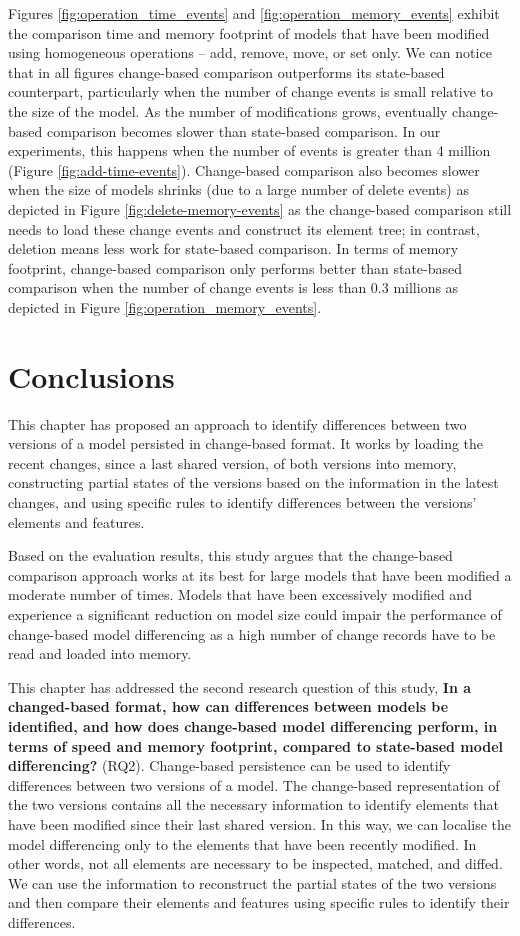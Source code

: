 Figures \ref{fig:operation_time_events} and \ref{fig:operation_memory_events} exhibit the comparison time and memory footprint of models that have been modified using homogeneous operations -- \textsf{add}, \textsf{remove}, \textsf{move}, or \textsf{set} only. We can notice that in all figures change-based comparison outperforms its state-based counterpart, particularly when the number of change events is small relative to the size of the model. As the number of modifications grows, eventually change-based comparison becomes slower than state-based comparison. In our experiments, this happens when the number of events is greater than 4 million (Figure \ref{fig:add-time-events}). Change-based comparison also becomes slower when the size of models shrinks (due to a large number of delete events) as depicted in Figure \ref{fig:delete-memory-events} as the change-based comparison still needs to load these change events and construct its element tree; in contrast, deletion means less work for state-based comparison. In terms of memory footprint, change-based comparison only performs better than state-based comparison when the number of change events is less than 0.3 millions as depicted in Figure \ref{fig:operation_memory_events}.

\section{Conclusions}
\label{sec:conclusions_6}
This chapter has proposed an approach to identify differences between two versions of a model persisted in change-based format. It works by loading the recent changes, since a last shared version, of both versions into memory, constructing partial states of the versions based on the information in the latest changes, and using specific rules to identify differences between the versions' elements and features.   

Based on the evaluation results, this study argues that the change-based comparison approach works at its best for large models that have been modified a moderate number of times. Models that have been excessively modified and experience a significant reduction on model size could impair the performance of change-based model differencing as a high number of change records have to be read and loaded into memory.

This chapter has addressed the second research question of this study, \textbf{In a changed-based format, how can differences between models be identified, and how does change-based model differencing perform, in terms of speed and memory footprint, compared to state-based model differencing?} (RQ2). Change-based persistence can be used to identify differences between two versions of a model. The change-based representation of the two versions contains all the necessary information to identify elements that have been modified since their last shared version. In this way, we can localise the model differencing only to the elements that have been recently modified. In other words, not all elements are necessary to be inspected, matched, and diffed. We can use the information to reconstruct the partial states of the two versions and then compare their elements and features using specific rules to identify their differences.  

